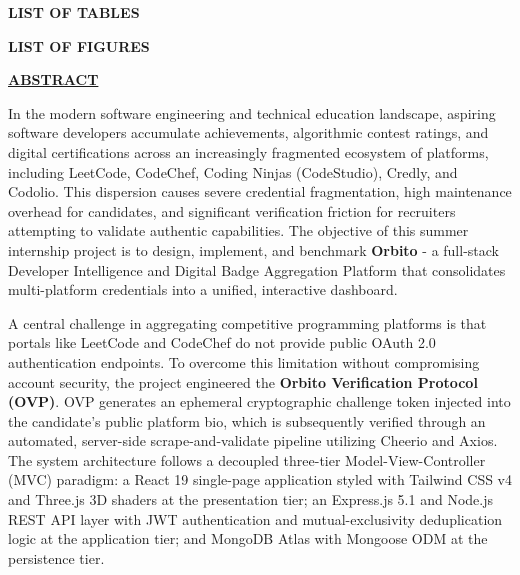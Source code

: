 \documentclass[12pt,a4paper]{article}
\makeatletter
\renewcommand\listoftables{%
    \newpage
    \vspace*{0pt}
    \begin{center}
      {\Large\bfseries LIST OF TABLES\par}
    \end{center}
    \vspace{0.4cm}
    \@starttoc{lot}%
}
\renewcommand\listoffigures{%
    \newpage
    \vspace*{0pt}
    \begin{center}
      {\Large\bfseries LIST OF FIGURES\par}
    \end{center}
    \vspace{0.4cm}
    \@starttoc{lof}%
}
\makeatother
\begin{document}
\newpage

\listoftables

\newpage

\listoffigures

\newpage

\vspace*{0pt}
\begin{center}
    {\Large\bfseries\underline{ABSTRACT}\par}
\end{center}
\vspace{0.6cm}

\noindent
In the modern software engineering and technical education landscape, aspiring software developers accumulate achievements, algorithmic contest ratings, and digital certifications across an increasingly fragmented ecosystem of platforms, including LeetCode, CodeChef, Coding Ninjas (CodeStudio), Credly, and Codolio. This dispersion causes severe credential fragmentation, high maintenance overhead for candidates, and significant verification friction for recruiters attempting to validate authentic capabilities. The objective of this summer internship project is to design, implement, and benchmark \textbf{Orbito} - a full-stack Developer Intelligence and Digital Badge Aggregation Platform that consolidates multi-platform credentials into a unified, interactive dashboard.

\vspace{0.4cm}
\noindent
A central challenge in aggregating competitive programming platforms is that portals like LeetCode and CodeChef do not provide public OAuth 2.0 authentication endpoints. To overcome this limitation without compromising account security, the project engineered the \textbf{Orbito Verification Protocol (OVP)}. OVP generates an ephemeral cryptographic challenge token injected into the candidate's public platform bio, which is subsequently verified through an automated, server-side scrape-and-validate pipeline utilizing Cheerio and Axios. The system architecture follows a decoupled three-tier Model-View-Controller (MVC) paradigm: a React 19 single-page application styled with Tailwind CSS v4 and Three.js 3D shaders at the presentation tier; an Express.js 5.1 and Node.js REST API layer with JWT authentication and mutual-exclusivity deduplication logic at the application tier; and MongoDB Atlas with Mongoose ODM at the persistence tier.
\end{document}
